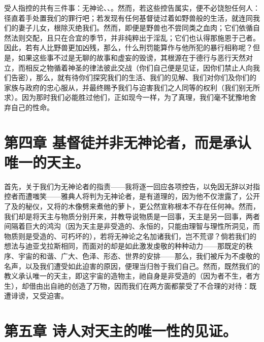 受人指控的共有三件事：无神论、、。然而，若这些控告属实，便不必饶恕任何人：径直着手处置我们的罪行吧；若发现有任何基督徒过着如野兽般的生活，就连同我们的妻子儿女，根除灭绝我们。然而，即便是野兽也不尝同类之血肉；它们依循自然法则交配，且只在合宜的季节，并非纯粹出于淫乱；它们也认得那施恩于己者。因此，若有人比野兽更加凶残，那么，什么刑罚能算作与他所犯的暴行相称呢？但是，如果这些事不过是无聊的故事和虚妄的毁谤，其根源在于德行与恶行天然对立，而相反之物循着神圣的律法彼此交战（你们自己便是见证，因你们禁止人向我们告密），那么，就有待你们探究我们的生活、我们的见解、我们对你们及你们的家族与政府的忠心服从，并最终赐予我们与迫害我们之人同等的权利（我们别无所求）。因为那时我们必能胜过他们，正如现今一样，为了真理，我们毫不犹豫地舍弃自己的性命。\par


\section{第四章 基督徒并非无神论者，而是承认唯一的天主。}

首先，关于我们为无神论者的指责——我将逐一回应各项控告，以免因无辞以对指控者而遭嗤笑——雅典人将判为无神论者，是有道理的，因为他不仅泄露了，公开了及的秘仪，又将的木像劈来煮他的萝卜，更公然宣称根本不存在任何神。然而，我们却是将天主与物质分别开来，并教导说物质是一回事，天主是另一回事，两者间隔着巨大的鸿沟（因为天主是非受造的、永恒的，只能由理智与理性所洞见，而物质则是受造的、可朽坏的），若将无神论之名加诸我们，岂不荒谬？倘若我们的想法与迪亚戈拉斯相同，而面对的却是如此激发虔敬的种种动力——那既定的秩序、宇宙的和谐、广大、色泽、形态、世界的安排——那么，我们被斥为不虔敬的名声，以及我们遭受如此迫害的原因，便理当归咎于我们自己。然而，既然我们的教义承认唯一的天主，即这宇宙的造物主，祂自身是非受造的（因为者不生，者方生），却借由出自祂的创造了万物，因而我们在两方面都蒙受了不合理的对待：既遭诽谤，又受迫害。\par


\section{第五章 诗人对天主的唯一性的见证。}

